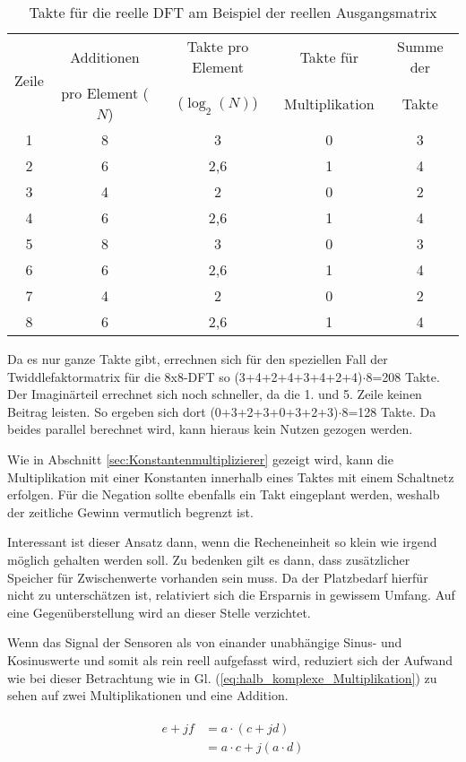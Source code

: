 \begin{table}[htbp]
\centering
\caption{Takte für die reelle DFT am Beispiel der reellen Ausgangsmatrix}
\begin{tabular}{ccccc}
\hline
\multirow{2}{*}{Zeile} & Additionen & Takte pro Element & Takte für & Summe der\\
      & pro Element ($N$) & ($\log_2(N)$) & Multiplikation & Takte\\
\hline
 1& 8 & 3   &0 &3\\
 2& 6 & 2,6 &1 &4\\
 3& 4 & 2   &0 &2\\
 4& 6 & 2,6 &1 &4\\
 5& 8 & 3   &0 &3\\
 6& 6 & 2,6 &1 &4\\
 7& 4 & 2   &0 &2\\
 8& 6 & 2,6 &1 &4\\
\hline
\end{tabular}
\end{table}

Da es nur ganze Takte gibt, errechnen sich für den speziellen Fall der Twiddlefaktormatrix für die 8x8-DFT so (3+4+2+4+3+4+2+4)$\cdot$8=208 Takte. Der Imaginärteil errechnet 
sich noch schneller, da die 1. und 5. Zeile keinen Beitrag leisten. So ergeben sich dort (0+3+2+3+0+3+2+3)$\cdot$8=128 Takte. Da beides parallel berechnet wird, kann hieraus
kein Nutzen gezogen werden.


Wie in Abschnitt \ref{sec:Konstantenmultiplizierer} gezeigt wird, kann die Multiplikation
mit einer Konstanten innerhalb eines Taktes mit einem Schaltnetz erfolgen. Für die Negation sollte ebenfalls ein Takt eingeplant werden, weshalb der zeitliche Gewinn vermutlich
begrenzt ist.


Interessant ist dieser Ansatz dann, wenn die Recheneinheit so klein wie irgend möglich gehalten werden soll. Zu bedenken gilt es dann, dass zusätzlicher Speicher für 
Zwischenwerte vorhanden sein muss. Da der Platzbedarf hierfür nicht zu unterschätzen ist, relativiert sich die Ersparnis in gewissem Umfang. Auf eine Gegenüberstellung
wird an dieser Stelle verzichtet.


Wenn das Signal der Sensoren als von einander unabhängige Sinus- und Kosinuswerte  und somit als rein reell aufgefasst wird, reduziert sich der Aufwand wie 
bei dieser Betrachtung wie in Gl. (\ref{eq:halb_komplexe_Multiplikation}) zu sehen auf zwei Multiplikationen und eine Addition. 

\begin{align}\label{eq:halb_komplexe_Multiplikation}
\begin{split}
 e + jf &= a \cdot (c + jd)\\
        &= a \cdot c + j(a \cdot d)\\
\end{split}
\end{align}

